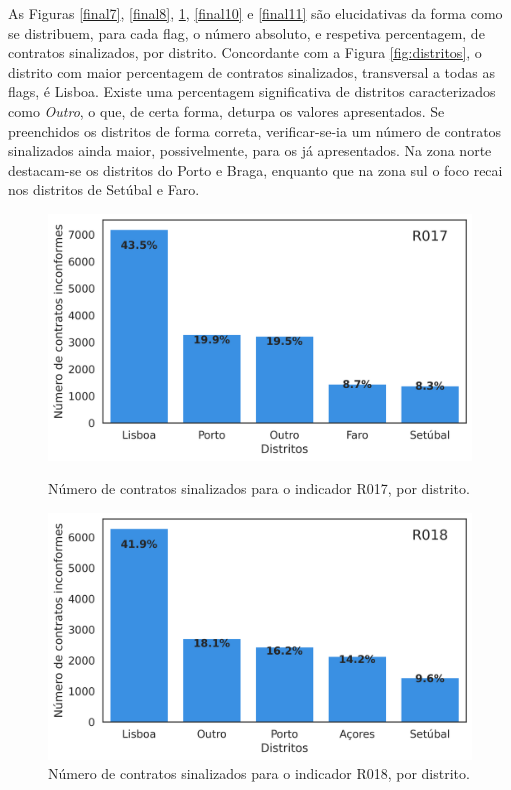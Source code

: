 As Figuras \ref{final7}, \ref{final8}, \ref{final9}, \ref{final10} e \ref{final11} são elucidativas da forma como se distribuem, para cada flag, o número absoluto, e respetiva percentagem, de contratos sinalizados, por distrito. Concordante com a Figura \ref{fig:distritos}, o distrito com maior percentagem de contratos sinalizados, transversal a todas as flags, é Lisboa. Existe uma percentagem significativa de distritos caracterizados como \textit{Outro}, o que, de certa forma, deturpa os valores apresentados. Se preenchidos os distritos de forma correta, verificar-se-ia um número de contratos sinalizados ainda maior, possivelmente, para os já apresentados. Na zona norte destacam-se os distritos do Porto e Braga, enquanto que na zona sul o foco recai nos distritos de Setúbal e Faro. 



\begin{figure}[H]
	\centering
	\begin{minipage}{.44\linewidth}
		\includegraphics[width=\linewidth]{imagens/final/bar_R017.png}
				\caption{Número de contratos sinalizados para o indicador R017, por distrito.}
		\label{final8}
		
	\end{minipage}
	\hfill
	\begin{minipage}{.44\linewidth}
		\includegraphics[width=\linewidth]{imagens/final/bar_R018.png}
		\caption{Número de contratos sinalizados para o indicador R018, por distrito.}
		\label{final9}
		
	\end{minipage}
\end{figure}


